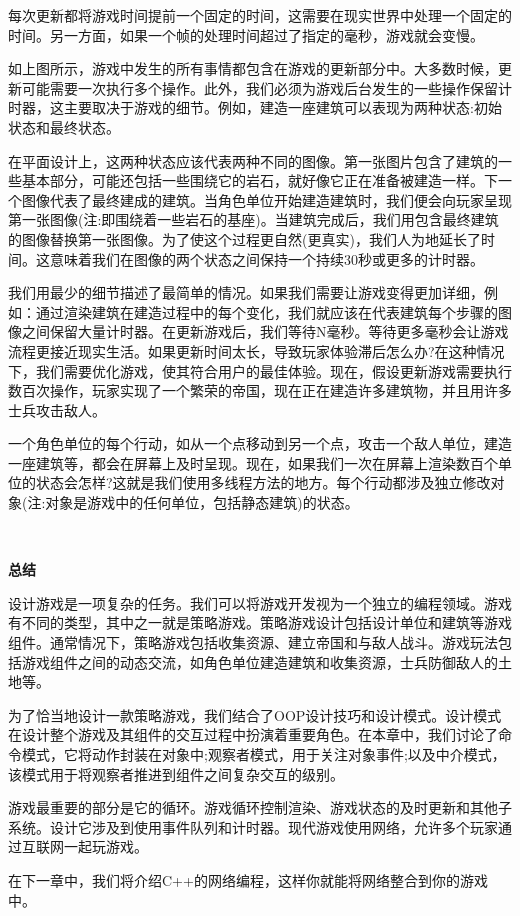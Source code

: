 每次更新都将游戏时间提前一个固定的时间，这需要在现实世界中处理一个固定的时间。另一方面，如果一个帧的处理时间超过了指定的毫秒，游戏就会变慢。 \par
如上图所示，游戏中发生的所有事情都包含在游戏的更新部分中。大多数时候，更新可能需要一次执行多个操作。此外，我们必须为游戏后台发生的一些操作保留计时器，这主要取决于游戏的细节。例如，建造一座建筑可以表现为两种状态:初始状态和最终状态。 \par
在平面设计上，这两种状态应该代表两种不同的图像。第一张图片包含了建筑的一些基本部分，可能还包括一些围绕它的岩石，就好像它正在准备被建造一样。下一个图像代表了最终建成的建筑。当角色单位开始建造建筑时，我们便会向玩家呈现第一张图像(注:即围绕着一些岩石的基座)。当建筑完成后，我们用包含最终建筑的图像替换第一张图像。为了使这个过程更自然(更真实)，我们人为地延长了时间。这意味着我们在图像的两个状态之间保持一个持续30秒或更多的计时器。 \par
我们用最少的细节描述了最简单的情况。如果我们需要让游戏变得更加详细，例如：通过渲染建筑在建造过程中的每个变化，我们就应该在代表建筑每个步骤的图像之间保留大量计时器。在更新游戏后，我们等待N毫秒。等待更多毫秒会让游戏流程更接近现实生活。如果更新时间太长，导致玩家体验滞后怎么办?在这种情况下，我们需要优化游戏，使其符合用户的最佳体验。现在，假设更新游戏需要执行数百次操作，玩家实现了一个繁荣的帝国，现在正在建造许多建筑物，并且用许多士兵攻击敌人。 \par
一个角色单位的每个行动，如从一个点移动到另一个点，攻击一个敌人单位，建造一座建筑等，都会在屏幕上及时呈现。现在，如果我们一次在屏幕上渲染数百个单位的状态会怎样?这就是我们使用多线程方法的地方。每个行动都涉及独立修改对象(注:对象是游戏中的任何单位，包括静态建筑)的状态。 \par

\noindent\textbf{}\ \par
\textbf{总结} \ \par
设计游戏是一项复杂的任务。我们可以将游戏开发视为一个独立的编程领域。游戏有不同的类型，其中之一就是策略游戏。策略游戏设计包括设计单位和建筑等游戏组件。通常情况下，策略游戏包括收集资源、建立帝国和与敌人战斗。游戏玩法包括游戏组件之间的动态交流，如角色单位建造建筑和收集资源，士兵防御敌人的土地等。 \par
为了恰当地设计一款策略游戏，我们结合了OOP设计技巧和设计模式。设计模式在设计整个游戏及其组件的交互过程中扮演着重要角色。在本章中，我们讨论了命令模式，它将动作封装在对象中;观察者模式，用于关注对象事件;以及中介模式，该模式用于将观察者推进到组件之间复杂交互的级别。  \par
游戏最重要的部分是它的循环。游戏循环控制渲染、游戏状态的及时更新和其他子系统。设计它涉及到使用事件队列和计时器。现代游戏使用网络，允许多个玩家通过互联网一起玩游戏。 \par
在下一章中，我们将介绍C++的网络编程，这样你就能将网络整合到你的游戏中。 \par

